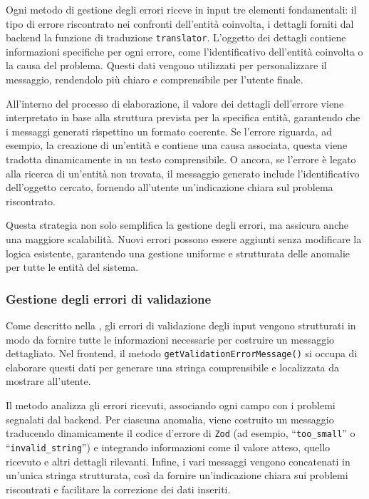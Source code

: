 Ogni metodo di gestione degli errori riceve in input tre elementi fondamentali: il tipo di errore riscontrato nei confronti dell'entità coinvolta, i dettagli forniti dal backend la funzione di traduzione \texttt{translator}. L'oggetto dei dettagli contiene informazioni specifiche per ogni errore, come l’identificativo dell’entità coinvolta o la causa del problema. Questi dati vengono utilizzati per personalizzare il messaggio, rendendolo più chiaro e comprensibile per l’utente finale.

All’interno del processo di elaborazione, il valore dei dettagli dell’errore viene interpretato in base alla struttura prevista per la specifica entità, garantendo che i messaggi generati rispettino un formato coerente. Se l’errore riguarda, ad esempio, la creazione di un’entità e contiene una causa associata, questa viene tradotta dinamicamente in un testo comprensibile. O ancora, se l’errore è legato alla ricerca di un’entità non trovata, il messaggio generato include l’identificativo dell’oggetto cercato, fornendo all’utente un’indicazione chiara sul problema riscontrato.

Questa strategia non solo semplifica la gestione degli errori, ma assicura anche una maggiore scalabilità. Nuovi errori possono essere aggiunti senza modificare la logica esistente, garantendo una gestione uniforme e strutturata delle anomalie per tutte le entità del sistema.

\subsubsection{Gestione degli errori di validazione}
Come descritto nella , gli errori di validazione degli input vengono strutturati in modo da fornire tutte le informazioni necessarie per costruire un messaggio dettagliato. Nel frontend, il metodo \texttt{getValidationErrorMessage()} si occupa di elaborare questi dati per generare una stringa comprensibile e localizzata da mostrare all’utente.
%

%
Il metodo analizza gli errori ricevuti, associando ogni campo con i problemi segnalati dal backend. Per ciascuna anomalia, viene costruito un messaggio traducendo dinamicamente il codice d’errore di \texttt{Zod} (ad esempio, ``\texttt{too\_small}'' o ``\texttt{invalid\_string}'') e integrando informazioni come il valore atteso, quello ricevuto e altri dettagli rilevanti. Infine, i vari messaggi vengono concatenati in un'unica stringa strutturata, così da fornire un’indicazione chiara sui problemi riscontrati e facilitare la correzione dei dati inseriti.


